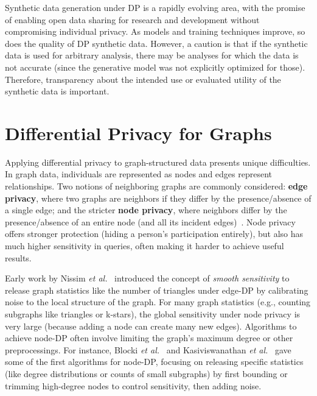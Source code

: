 \documentclass[11pt]{article}
\theoremstyle{remark}
\theoremstyle{definition}
\theoremstyle{plain}
\begin{document}
Synthetic data generation under DP is a rapidly evolving area, with the promise of enabling open data sharing for research and development without compromising individual privacy. As models and training techniques improve, so does the quality of DP synthetic data. However, a caution is that if the synthetic data is used for arbitrary analysis, there may be analyses for which the data is not accurate (since the generative model was not explicitly optimized for those). Therefore, transparency about the intended use or evaluated utility of the synthetic data is important.

\section{Differential Privacy for Graphs}

Applying differential privacy to graph-structured data presents unique difficulties. In graph data, individuals are represented as nodes and edges represent relationships. Two notions of neighboring graphs are commonly considered: \textbf{edge privacy}, where two graphs are neighbors if they differ by the presence/absence of a single edge; and the stricter \textbf{node privacy}, where neighbors differ by the presence/absence of an entire node (and all its incident edges)~\cite{Hay2009, Rastogi2009}. Node privacy offers stronger protection (hiding a person's participation entirely), but also has much higher sensitivity in queries, often making it harder to achieve useful results.

Early work by Nissim \textit{et al.}~\cite{Nissim2007} introduced the concept of \emph{smooth sensitivity} to release graph statistics like the number of triangles under edge-DP by calibrating noise to the local structure of the graph. For many graph statistics (e.g., counting subgraphs like triangles or k-stars), the global sensitivity under node privacy is very large (because adding a node can create many new edges). Algorithms to achieve node-DP often involve limiting the graph's maximum degree or other preprocessings. For instance, Blocki \textit{et al.}~\cite{Blocki2013} and Kasiviswanathan \textit{et al.}~\cite{Kasiviswanathan2013} gave some of the first algorithms for node-DP, focusing on releasing specific statistics (like degree distributions or counts of small subgraphs) by first bounding or trimming high-degree nodes to control sensitivity, then adding noise.
\end{document}
